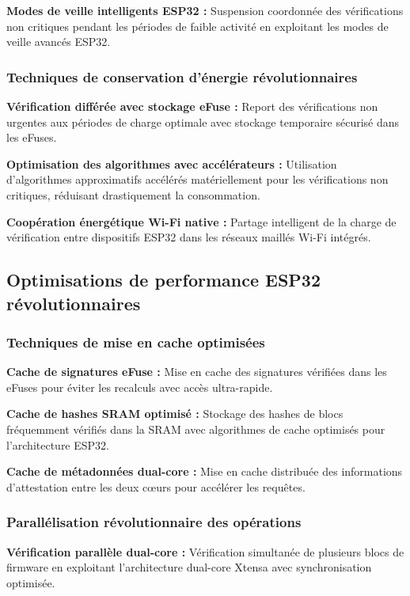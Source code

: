 \textbf{Modes de veille intelligents ESP32 :} Suspension coordonnée des vérifications non critiques pendant les périodes de faible activité en exploitant les modes de veille avancés ESP32.

\subsubsection{Techniques de conservation d'énergie révolutionnaires}

\textbf{Vérification différée avec stockage eFuse :} Report des vérifications non urgentes aux périodes de charge optimale avec stockage temporaire sécurisé dans les eFuses.

\textbf{Optimisation des algorithmes avec accélérateurs :} Utilisation d'algorithmes approximatifs accélérés matériellement pour les vérifications non critiques, réduisant drastiquement la consommation.

\textbf{Coopération énergétique Wi-Fi native :} Partage intelligent de la charge de vérification entre dispositifs ESP32 dans les réseaux maillés Wi-Fi intégrés.

\subsection{Optimisations de performance ESP32 révolutionnaires}

\subsubsection{Techniques de mise en cache optimisées}

\textbf{Cache de signatures eFuse :} Mise en cache des signatures vérifiées dans les eFuses pour éviter les recalculs avec accès ultra-rapide.

\textbf{Cache de hashes SRAM optimisé :} Stockage des hashes de blocs fréquemment vérifiés dans la SRAM avec algorithmes de cache optimisés pour l'architecture ESP32.

\textbf{Cache de métadonnées dual-core :} Mise en cache distribuée des informations d'attestation entre les deux cœurs pour accélérer les requêtes.

\subsubsection{Parallélisation révolutionnaire des opérations}

\textbf{Vérification parallèle dual-core :} Vérification simultanée de plusieurs blocs de firmware en exploitant l'architecture dual-core Xtensa avec synchronisation optimisée.

